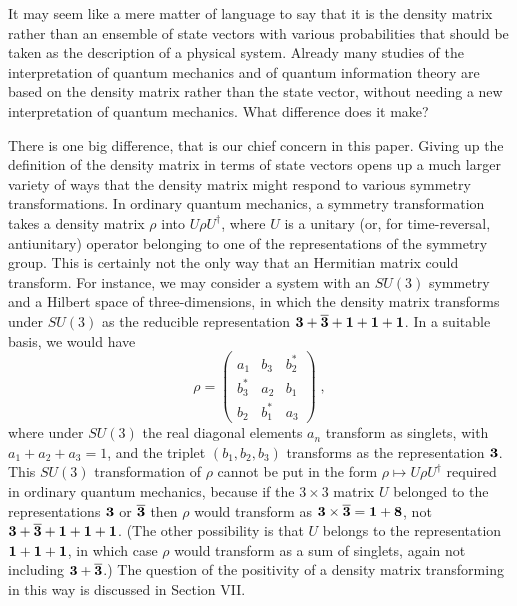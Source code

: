 \documentclass[12pt]{article}
\def\BM#1{\mbox{\boldmath{$#1$}}}
\begin{document}
It may seem like a mere matter of language to say that it is the  density matrix rather than  an ensemble of state vectors with various probabilities that should be taken as the description of a physical system.  Already many studies of the interpretation of quantum mechanics and of quantum information theory are  based on the density matrix rather than the state vector, without needing a new interpretation of quantum mechanics.  What difference does it make?  

There is one big difference, that is our chief concern in this paper. Giving up the definition of the density matrix in terms of state vectors opens up a much larger variety of ways that the density matrix might respond to various symmetry transformations.  In ordinary quantum mechanics, a symmetry transformation takes a density matrix $\rho$ into $U\rho U^\dagger$, where $U$ is a unitary (or, for time-reversal, antiunitary) operator belonging to one of the representations of the symmetry group.  This is certainly not the only way that an Hermitian matrix could transform.    For instance, we may consider a system with an $SU(3)$ symmetry and  a Hilbert space of three-dimensions, in which the density matrix transforms under $SU(3)$ as the reducible representation ${\BM 3}+\overline{\BM 3}+{\BM 1}+{\BM 1}+{\BM 1}$.  In a suitable basis, we would have
$$\rho=\left(\begin{array}{ccc}a_1 & b_3 & b_2^* \\ b_3^* & a_2 & b_1 \\ b_2 & b_1^* & a_3 \end{array}\right)\;,$$
where  under $SU(3)$ the real diagonal elements $a_n$ transform as singlets, with $a_1+a_2+a_3=1$, and the triplet $(b_1,b_2,b_3)$ transforms as the representation ${\BM 3}$.
This $SU(3)$ transformation of $\rho$  cannot be put in the form $\rho\mapsto U\rho U^\dagger$ required in ordinary quantum mechanics, because if the $3\times 3$ matrix $U$  belonged to the representations ${\BM 3}$ or $\overline{\BM 3}$ then $\rho$ would transform as  ${\BM 3}\times\overline{\BM 3}= {\BM 1}+{\BM 8}$, not ${\BM 3}+\overline{\BM 3}+{\BM 1}+{\BM 1}+{\BM 1}$.  (The other possibility is that $U$  belongs to the representation ${\BM 1}+{\BM 1}+{\BM 1}$, in which case $\rho$ would transform as a sum of singlets, again not including ${\BM 3}+\overline{\BM 3}$.)  The question of the positivity of a density matrix transforming in this way is discussed in Section VII.
\end{document}
